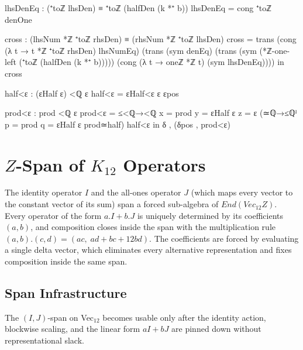 \documentclass[11pt,a4paper]{book}
\def\cdot{.}%
\def\mathrm#1{#1}%
\def\mathbb#1{#1}%
\begin{document}
\begin{code}
        lhsDenEq : (⁺toℤ lhsDen) ≡ ⁺toℤ (halfDen (k *⁺ b))
        lhsDenEq = cong ⁺toℤ denOne

        cross : (lhsNum *ℤ ⁺toℤ rhsDen) ≡ (rhsNum *ℤ ⁺toℤ lhsDen)
        cross =
          trans
            (cong (λ t → t *ℤ ⁺toℤ rhsDen) lhsNumEq)
            (trans
              (sym denEq)
              (trans
                (sym (*ℤ-one-left (⁺toℤ (halfDen (k *⁺ b)))))
                (cong (λ t → oneℤ *ℤ t) (sym lhsDenEq))))
      in
      cross

    half<ε : (εHalf ε) <ℚ ε
    half<ε = εHalf<ε ε εpos

    prod<ε : prod <ℚ ε
    prod<ε =
      ≤<ℚ→<ℚ
        {x = prod} {y = εHalf ε} {z = ε}
        (≃ℚ→≤ℚˡ {p = prod} {q = εHalf ε} prod≃half)
        half<ε
  in
  δ , (δpos , prod<ε)
\end{code}


\chapter{$\mathbb{Z}$-Span of $K_{12}$ Operators}
\label{ch:z-span-k12}

The identity operator $I$ and the all-ones operator $J$ (which maps
every vector to the constant vector of its sum) span a forced
sub-algebra of $\mathrm{End}(\mathrm{Vec}_{12}\mathbb{Z})$. Every
operator of the form $a \cdot I + b \cdot J$ is uniquely determined by
its coefficients $(a,b)$, and composition closes inside the span with
the multiplication rule
$(a,b) \cdot (c,d) = (ac,\; ad + bc + 12bd)$.
The coefficients are forced by evaluating a single delta vector, which
eliminates every alternative representation and fixes composition inside the
same span.

\section{Span Infrastructure}

The $(I,J)$-span on Vec$_{12}$ becomes usable only after the identity action, blockwise scaling, and
the linear form $aI+bJ$ are pinned down without representational slack.
\end{document}
